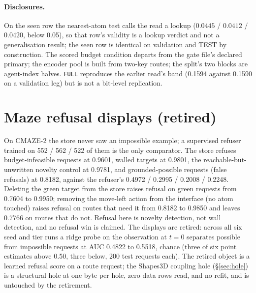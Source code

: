 \documentclass{article} %
\begin{document}
\paragraph{Disclosures.} On the seen row the nearest-atom test calls the read a lookup
($0.0445$ / $0.0412$ / $0.0420$, below 0.05), so that row's validity is a lookup verdict and not a
generalisation result; the seen row is identical on validation and TEST by construction. The
scored budget condition departs from the gate file's declared primary; the encoder pool is built
from two-key routes; the split's two blocks are agent-index halves. \texttt{FULL} reproduces the
earlier read's band (0.1594 against 0.1590 on a validation leg) but is not a bit-level
replication. %

\section{Maze refusal displays (retired)}
\label{app:mazerefusal}

On CMAZE-2 the store never saw an impossible example; a supervised refuser trained on 552 / 562 /
522 of them is the only comparator. The store refuses budget-infeasible requests at 0.9601, walled
targets at 0.9801, the reachable-but-unwritten novelty control at 0.9781, and grounded-possible
requests (false refusals) at 0.8182, against the refuser's 0.4972 / 0.2995 / 0.2008 / 0.2248.
Deleting the green target from the store raises refusal on green requests from 0.7604 to 0.9950;
removing the move-left action from the interface (no atom touched) raises refusal on routes that
need it from 0.8182 to 0.9850 and leaves 0.7766 on routes that do not.
Refusal here is novelty detection, not wall detection, and no refusal win is claimed. The displays
are retired: across all six seed and tier runs a ridge probe on the observation at $t=0$ separates
possible from impossible requests at AUC 0.4822 to 0.5518, chance (three of six point estimates above 0.50, three below, 200 test requests each). The retired object is a learned
refusal score on a route request; the Shapes3D coupling hole (\S\ref{sec:hole}) is a structural
hole at one byte per hole, zero data rows read, and no refit, and is untouched by the retirement.

\end{document}
